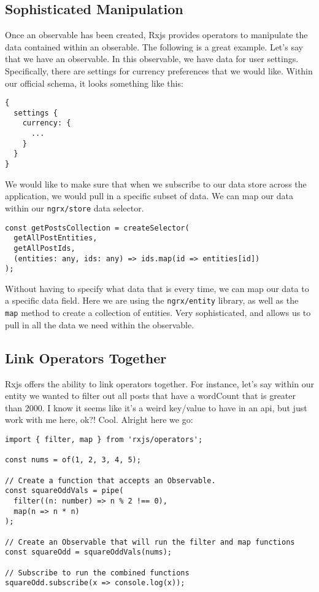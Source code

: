\subsection{Sophisticated Manipulation}
Once an observable has been created, Rxjs provides operators to manipulate 
the data contained within an obserable. The following is a great example. Let's
say that we have an observable. In this observable, we have data for user 
settings. Specifically, there are settings for currency preferences that we 
would like. Within our official schema, it looks something like this: 
\begin{lstlisting}
{
  settings {
    currency: {
      ...
    }
  }
}  
\end{lstlisting}

We would like to make sure that when we subscribe to our data store 
across the application, we would pull in a specific subset of data. We can map 
our data within our \lstinline{ngrx/store} data selector. 

\begin{lstlisting}[caption=settings.selector.ts]
const getPostsCollection = createSelector(
  getAllPostEntities,
  getAllPostIds,
  (entities: any, ids: any) => ids.map(id => entities[id])
);
\end{lstlisting}

Without having to specify what data that is every time, we can map our data 
to a specific data field. Here we are using the \lstinline{ngrx/entity} 
library, as well as the \lstinline{map} method to create a collection of 
entities. Very sophisticated, and allows us to pull in all the data we need
within the observable.

\subsection{Link Operators Together}
Rxjs offers the ability to link operators together. For instance, let's say 
within our entity we wanted to filter out all posts that have a wordCount 
that is greater than 2000. I know it seems like it's a weird key/value to have 
in an api, but just work with me here, ok?! Cool. Alright here we go: 
\begin{lstlisting}
import { filter, map } from 'rxjs/operators';

const nums = of(1, 2, 3, 4, 5);

// Create a function that accepts an Observable.
const squareOddVals = pipe(
  filter((n: number) => n % 2 !== 0),
  map(n => n * n)
);

// Create an Observable that will run the filter and map functions
const squareOdd = squareOddVals(nums);

// Subscribe to run the combined functions
squareOdd.subscribe(x => console.log(x));  
\end{lstlisting}

